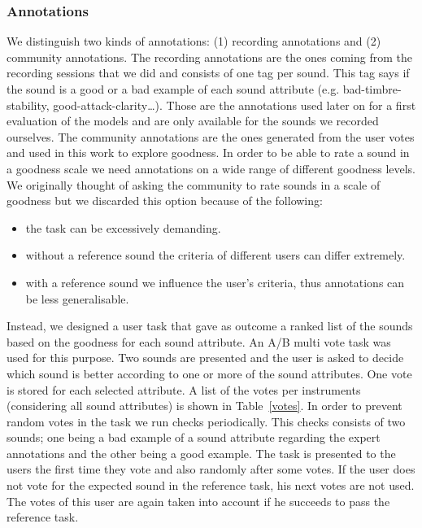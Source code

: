 \documentclass{article}
\begin{document}
\subsubsection{Annotations}
We distinguish two kinds of annotations: (1) recording annotations and (2) community annotations. The recor\-ding annotations are the ones coming from the recording sessions that we did and consists of one tag per sound. This tag says if the sound is a good or a bad example of each sound attribute (e.g. bad-timbre-stability, good-attack-clarity…). Those are the annotations used later on for a first evaluation of the models and are only available for the sounds we recorded ourselves.
The community annotations are the ones generated from the user votes and used in this work to explore goodness. In order to be able to rate a sound in a goodness scale we need annotations on a wide range of different goodness levels. We originally thought of asking the community to rate sounds in a scale of goodness but we discarded this option because of the following:

\begin{itemize}
	\item{the task can be excessively demanding.}
	\item{without a reference sound the criteria of different users can differ extremely.}
	\item{with a reference sound we influence the user’s criteria, thus annotations can be less 	generalisable.}
\end{itemize}

Instead, we designed a user task that gave as outcome a ranked list of the sounds based on the goodness for each sound attribute. An A/B multi vote task was used for this purpose. Two sounds are presented and the user is asked to decide which sound is better according to one or more of the sound attributes. One vote is stored for each selected attribute. A list of the votes per instruments (considering all sound attributes) is shown in Table~\ref{votes}.
In order to prevent random votes in the task we run checks periodically. This checks consists of two sounds; one being a bad example of a sound attribute regarding the expert annotations and the other being a good example. The task is presented to the users the first time they vote and also randomly after some votes. If the user does not vote for the expected sound in the reference task, his next votes are not used. The votes of this user are again taken into account if he succeeds to pass the reference task. 
\end{document}
